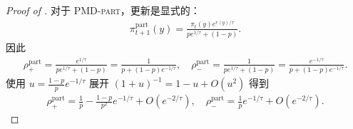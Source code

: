 \documentclass{article}
\theoremstyle{plain}
\theoremstyle{definition}
\theoremstyle{remark}
\begin{document}
\begin{proof}[Proof of ]
    对于 \textsc{PMD-part}，更新是显式的：
    \begin{align*}
        \pi^{\mathrm{part}}_{t+1}(y)
        =\frac{\pi_t(y)e^{r(y)/\tau}}{p e^{1/\tau}+(1-p)}.
    \end{align*}
    因此
    \begin{align*}
        \rho^{\mathrm{part}}_+ = \frac{e^{1/\tau}}{p e^{1/\tau}+(1-p)} = \frac{1}{p+(1-p)e^{-1/\tau}},
        \quad
        \rho^{\mathrm{part}}_- = \frac{1}{p e^{1/\tau}+(1-p)} = \frac{e^{-1/\tau}}{p+(1-p)e^{-1/\tau}}.
    \end{align*}
    使用 $u=\frac{1-p}{p}e^{-1/\tau}$  展开 $(1+u)^{-1}=1-u+O(u^2)$  得到
    \begin{align*}
        \rho^{\mathrm{part}}_+ = \frac{1}{p}-\frac{1-p}{p^2}e^{-1/\tau}+O(e^{-2/\tau}),
        \quad
        \rho^{\mathrm{part}}_- = \frac{1}{p}e^{-1/\tau}+O(e^{-2/\tau}).
    \end{align*}
\end{proof}
\end{document}
